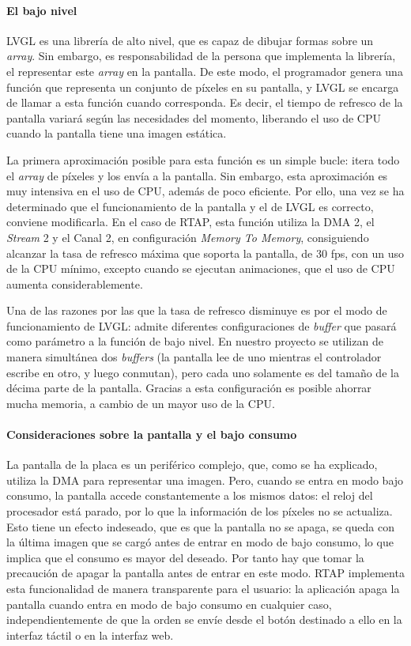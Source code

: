 \paragraph{El bajo nivel}
\label{subsubsec:bajo-nivel}
LVGL es una librería de alto nivel, que es capaz de dibujar formas sobre un \textit{array}. Sin embargo, es responsabilidad de la persona que implementa la librería, el representar este \textit{array} en la pantalla. De este modo, el programador genera una función que representa un conjunto de píxeles en su pantalla, y LVGL se encarga de llamar a esta función cuando corresponda. Es decir, el tiempo de refresco de la pantalla variará según las necesidades del momento, liberando el uso de CPU cuando la pantalla tiene una imagen estática.

La primera aproximación posible para esta función es un simple bucle: itera todo el \textit{array} de píxeles y los envía a la pantalla. Sin embargo, esta aproximación es muy intensiva en el uso de CPU, además de poco eficiente. Por ello, una vez se ha determinado que el funcionamiento de la pantalla y el de LVGL es correcto, conviene modificarla. En el caso de RTAP, esta función utiliza la DMA 2, el \textit{Stream} 2 y el Canal 2, en configuración \textit{Memory To Memory}, consiguiendo alcanzar la tasa de refresco máxima que soporta la pantalla, de 30 fps, con un uso de la CPU mínimo, excepto cuando se ejecutan animaciones, que el uso de CPU aumenta considerablemente.

Una de las razones por las que la tasa de refresco disminuye es por el modo de funcionamiento de LVGL: admite diferentes configuraciones de \textit{buffer} que pasará como parámetro a la función de bajo nivel. En nuestro proyecto se utilizan de manera simultánea dos \textit{buffers} (la pantalla lee de uno mientras el controlador escribe en otro, y luego conmutan), pero cada uno solamente es del tamaño de la décima parte de la pantalla. Gracias a esta configuración es posible ahorrar mucha memoria, a cambio de un mayor uso de la CPU.

\paragraph{Consideraciones sobre la pantalla y el bajo consumo}
\label{subsubsec:apagar-pantalla}
La pantalla de la placa es un periférico complejo, que, como se ha explicado, utiliza la DMA para representar una imagen. Pero, cuando se entra en modo bajo consumo, la pantalla accede constantemente a los mismos datos: el reloj del procesador está parado, por lo que la información de los píxeles no se actualiza. Esto tiene un efecto indeseado, que es que la pantalla no se apaga, se queda con la última imagen que se cargó antes de entrar en modo de bajo consumo, lo que implica que el consumo es mayor del deseado. Por tanto hay que tomar la precaución de apagar la pantalla antes de entrar en este modo. RTAP implementa esta funcionalidad de manera transparente para el usuario: la aplicación apaga la pantalla cuando entra en modo de bajo consumo en cualquier caso, independientemente de que la orden se envíe desde el botón destinado a ello en la interfaz táctil o en la interfaz web.


